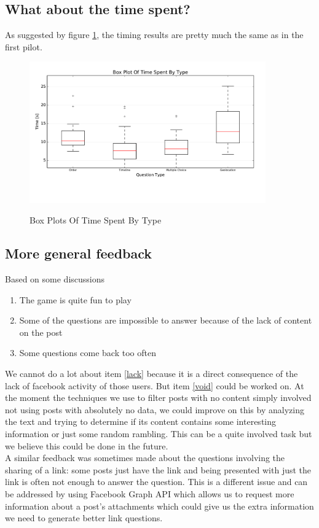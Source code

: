 \subsection{What about the time spent?}
As suggested by figure \ref{fig:p2BoxesTime}, the timing results are pretty much the same as in the first pilot.
\begin{figure}
\centering
{\includegraphics[width=4in]{images/pilot_2_boxplot_time.pdf}}
\caption{Box Plots Of Time Spent By Type}
\label{fig:p2BoxesTime}
\end{figure}

\subsection{More general feedback}
Based on some discussions
\begin{enumerate}
	\item The game is quite fun to play
	\item\label{void} Some of the questions are impossible to answer because of the lack of content on the post
	\item\label{lack} Some questions come back too often
\end{enumerate}
We cannot do a lot about item \ref{lack} because it is a direct consequence of the lack of facebook activity of those users. But item \ref{void} could be worked on. At the moment the techniques we use to filter posts with no content simply involved not using posts with absolutely no data, we could improve on this by analyzing the text and trying to determine if its content contains some interesting information or just some random rambling. This can be a quite involved task but we believe this could be done in the future.\\
A similar feedback was sometimes made about the questions involving the sharing of a link: some posts just have the link and being presented with just the link is often not enough to answer the question. This is a different issue and can be addressed by using Facebook Graph API which allows us to request more information about a post's attachments which could give us the extra information we need to generate better link questions.